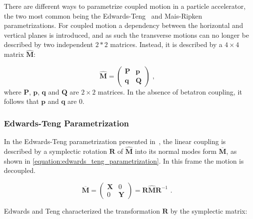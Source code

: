 There are different ways to parametrize coupled motion in a particle accelerator, the two most common being the Edwards-Teng~\cite{IEEE:Edwards:Parametrization_Linear_Coupled_Motion} and Mais-Ripken~\cite{AIP:Willeke:Methods_Beam_Optics} parametrizations.
For coupled motion a dependency between the horizontal and vertical planes is introduced, and as such the transverse motions can no longer be described by two independent \(2 * 2\) matrices.
Instead, it is described by a \(4 \times 4\) matrix \(\hat{\mathbf{M}}\):

\begin{equation}
    \hat{\mathbf{M}} = \left(
        \begin{array}{ll}
            \mathbf{P} & \mathbf{p} \\
            \mathbf{q} & \mathbf{Q}
    \end{array} \right) \text{ ,}
    \label{equation:coupled_motion_matrix}
\end{equation}
where \(\mathbf{P}\), \(\mathbf{p}\), \(\mathbf{q}\) and \(\mathbf{Q}\) are \(2 \times 2\) matrices.
In the absence of betatron coupling, it follows that \(\mathbf{p}\) and \(\mathbf{q}\) are \num{0}.

\subsubsection*{Edwards-Teng Parametrization}

In the Edwards-Teng parametrization presented in~\cite{IEEE:Edwards:Parametrization_Linear_Coupled_Motion}, the linear coupling is described by a symplectic rotation \(\mathbf{R}\) of \(\hat{\mathbf{M}}\) into its normal modes form \(\overline{\mathbf{M}}\), as shown in \cref{equation:edwards_teng_parametrization}.
In this frame the motion is decoupled.

\begin{equation}
    \overline{\mathbf{M}} = \left(
        \begin{array}{cc}
            \mathbf{X} & 0 \\
            0 & \mathbf{Y}
    \end{array} \right) = \mathbf{R} \hat{\mathbf{M}} \mathbf{R}^{-1} \text{ .}
    \label{equation:edwards_teng_parametrization}
\end{equation}

Edwards and Teng characterized the transformation \(\mathbf{R}\) by the symplectic matrix:

